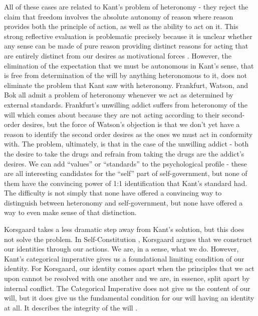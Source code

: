 \documentclass[phd,12pt,oneside,paper=letterpaper]{ubcthesis}
\begin{document}
All of these cases are related to Kant's problem of heteronomy - they reject the claim that freedom involves the absolute autonomy of reason where reason provides both the principle of action, as well as the ability to act on it. This strong reflective evaluation is problematic precisely because it is unclear whether any sense can be made of pure reason providing distinct reasons for acting that are entirely distinct from our desires as motivational forces \citep{williams1981}. However, the elimination of the expectation that we must be autonomous in Kant's sense, that is free from determination of the will by anything heteronomous to it, does not eliminate the problem that Kant saw with heteronomy. Frankfurt, Watson, and Bok all admit a problem of heteronomy whenever we act as determined by external standards. Frankfurt's unwilling addict suffers from heteronomy of the will which comes about because they are not acting according to their second-order desires, but the force of Watson's objection is that we don't yet have a reason to identify the second order desires as the ones we must act in conformity with. The problem, ultimately, is that in the case of the unwilling addict - both the desire to take the drugs and refrain from taking the drugs are the addict's desires. We can add ``values'' or ``standards'' to the psychological profile - these are all interesting candidates for the ``self'' part of self-government, but none of them have the convincing power of 1:1 identification that Kant's standard had. The difficulty is not simply that none have offered a convincing way to distinguish between heteronomy and self-government, but none have offered a way to even make sense of that distinction.

Korsgaard takes a less dramatic step away from Kant's solution, but this does not solve the problem. In Self-Constitution \citeyearpar{korsgaard2009}, Korsgaard argues that we construct our identities through our actions. We are, in a sense, what we do. However, Kant's categorical imperative gives us a foundational limiting condition of our identity. For Korsgaard, our identity comes apart when the principles that we act upon cannot be resolved with one another and we are, in essence, split apart by internal conflict. The Categorical Imperative does not give us the content of our will, but it does give us the fundamental condition for our will having an identity at all. It describes the integrity of the will \citep{korsgaard2009}.
\end{document}
